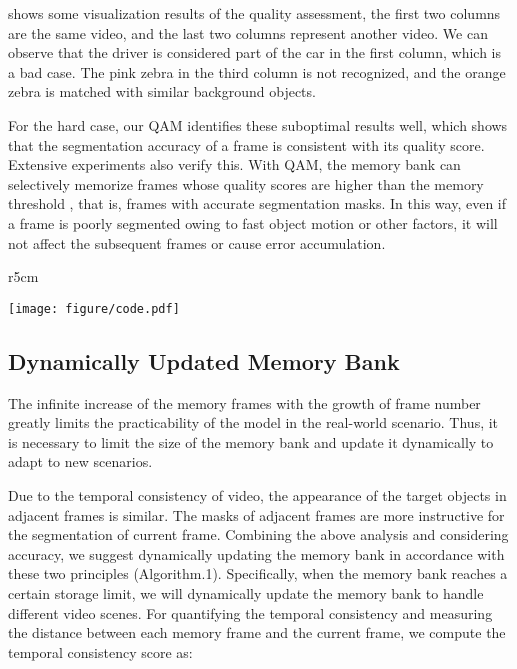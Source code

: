 \documentclass[runningheads]{llncs}
\begin{document}
     shows some visualization results of the quality assessment, the first two columns are the same video, and the last two columns represent another video. 
    We can observe that the driver is considered part of the car in the first column, which is a bad case.
    The pink zebra in the third column is not recognized, and the orange zebra is matched with similar background objects. 

    For the hard case,
    our QAM identifies these suboptimal results well, which shows that the segmentation accuracy of a frame is consistent with its quality score. 
    Extensive experiments also verify this.
    With QAM, the memory bank can selectively memorize frames whose quality scores are higher than the memory threshold , that is, frames with accurate segmentation masks.
    In this way, even if a frame is poorly segmented owing to
    fast object motion or other factors, 
    it will not affect the subsequent frames or cause error accumulation. 
    
    	\begin{wrapfigure}{r}{5cm}
		\begin{minipage}[p]{1\linewidth}
            \centering
			\texttt{[image: figure/code.pdf]}
			\label{memory cap}
		\end{minipage}
	\end{wrapfigure}      
    \subsection{Dynamically Updated Memory Bank}
     
The infinite increase of the memory frames with the growth of frame number greatly limits the practicability of the model in the real-world scenario.
    Thus, it is necessary to limit the size of the memory bank and update it dynamically to adapt to new scenarios.
    
    Due to the temporal consistency of video, the appearance of the target objects in adjacent frames is similar. 
The masks of adjacent frames are more instructive for the segmentation of current frame.
Combining the above analysis and considering accuracy, we suggest dynamically updating the memory bank in accordance with these two principles (Algorithm.1).
    Specifically, when the memory bank reaches a certain storage limit, we will dynamically update the memory bank to handle different video scenes.
    For quantifying the temporal consistency and measuring the distance between each memory frame and the current frame, we compute the temporal consistency score  as:
    
\end{document}
